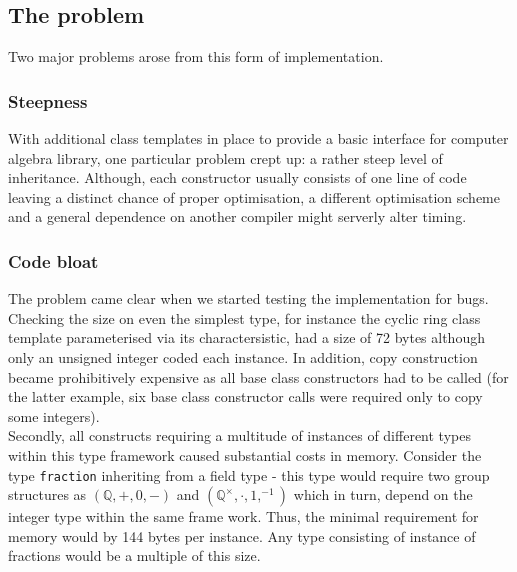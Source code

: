 \subsection{The problem}
Two major problems arose from this form of implementation.
\subsubsection{Steepness}
With additional class templates in place to provide a basic interface for computer algebra library, one particular problem crept up: a rather steep level of inheritance. Although, each constructor usually consists of one line of code leaving a distinct chance of proper optimisation, a different optimisation scheme and a general dependence on another compiler might serverly alter timing.\\
\subsubsection{Code bloat}
The problem came clear when we started testing the implementation for bugs. Checking the size on even the simplest type, for instance the cyclic ring class template parameterised via its charactersistic, had a size of 72 bytes although only an unsigned integer coded each instance. In addition, copy construction became prohibitively expensive as all base class constructors had to be called (for the latter example, six base class constructor calls were required only to copy some integers).\\Secondly, all constructs requiring a multitude of instances of different types within this type framework caused substantial costs in memory. Consider the type \texttt{fraction} inheriting from a field type - this type would require two group structures as $(\mathbb{Q}, +, 0, -)$ and $(\mathbb{Q}^\times, \cdot, 1, ^{-1})$ which in turn, depend on the integer type within the same frame work. Thus, the minimal requirement for memory would by 144 bytes per instance. Any type consisting of instance of fractions would be a multiple of this size.
